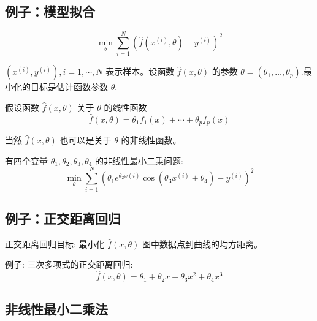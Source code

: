 \subsection{例子：模型拟合}

\begin{problem}
\begin{equation}
\min _{\theta} \sum_{i=1}^{N}\left(\hat{f}\left(x^{(i)}, \theta\right)-y^{(i)}\right)^{2}
\end{equation}

$ \left(x^{(i)}, y^{(i)}\right), i=1, \cdots, N $ 表示样本。设函数 $ \hat{f}(x, \theta) $ 的参数 $ \theta = \left(\theta_{1}, \ldots, \theta_{p}\right) $.最小化的目标是估计函数参数 $ \theta $.
\end{problem}

假设函数 $ \hat{f}(x, \theta) $ 关于 $ \theta $ 的线性函数
\begin{equation}
\hat{f}(x, \theta)=\theta_{1} f_{1}(x)+\cdots+\theta_{p} f_{p}(x)
\end{equation}

当然 $ \hat{f}(x, \theta) $ 也可以是关于 $ \theta $ 的非线性函数。

\begin{example}
    有四个变量 $ \theta_{1}, \theta_{2}, \theta_{3}, \theta_{4} $ 的非线性最小二乘问题:
\begin{equation}
\min _{\theta} \sum_{i=1}^{N}\left(\theta_{1} e^{\theta_{2} x(i)} \cos \left(\theta_{3} x^{(i)}+\theta_{4}\right)-y^{(i)}\right)^{2}
\end{equation}

\end{example}

\subsection{例子：正交距离回归}

正交距离回归目标: 最小化 $ \hat{f}(x, \theta) $ 图中数据点到曲线的均方距离。 

例子: 三次多项式的正交距离回归:
\begin{equation}
\hat{f}(x, \theta)=\theta_{1}+\theta_{2} x+\theta_{3} x^{2}+\theta_{4} x^{3}
\end{equation}


\subsection{非线性最小二乘法}

